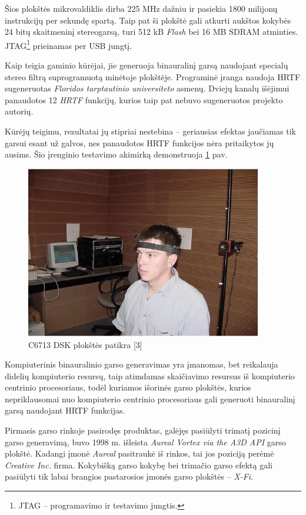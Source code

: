 \documentclass[]{vgtuef}
\begin{document}
Šios plokštės mikrovaldiklis dirba 225 MHz dažniu ir pasiekia 1800 milijonų instrukcijų per sekundę spartą. Taip pat ši plokštė gali atkurti aukštos kokybės 24 bitų skaitmeninį stereogarsą, turi 512 kB \textit{Flash} bei 16 MB SDRAM atminties. JTAG\footnote{  JTAG -- programavimo ir testavimo jungtis.} prieinamas per USB jungtį.

Kaip teigia gaminio kūrėjai, jie generuoja binauralinį garsą naudojant specialų stereo filtrą suprogramuotą minėtoje plokštėje. Programinė įranga naudoja HRTF sugeneruotas \textit{Floridos tarptautinio universiteto} asmenų. Dviejų kanalų išėjimui panaudotos 12 \textit{HRTF} funkcijų, kurios taip pat nebuvo sugeneruotos projekto autorių. 

Kūrėjų teigimu, rezultatai jų stipriai nestebina – geriausias efektas jaučiamas tik garsui esant už galvos, nes panaudotos HRTF funkcijos nėra pritaikytos jų ausims. Šio įrenginio testavimo akimirką demonstruoja \ref{fig:C6713_dsk_board_checkout} pav.

\begin{figure}[!ht]
  \centering
  \includegraphics[width=390px]{img/c6713_patikra.jpg}
  \caption{C6713 DSK plokštės patikra [3]}
  \label{fig:C6713_dsk_board_checkout}
\end{figure}


Kompiuterinis binauralinio garso generavimas yra įmanomas, bet reikalauja didelių kompiuterio resursų, taip atimdamas skaičiavimo resursus iš kompiuterio centrinio procesoriaus, todėl kuriamos išorinės garso plokštės, kurios nepriklausomai nuo kompiuterio centrinio procesoriaus gali generuoti binauralinį garsą naudojant HRTF funkcijas.

Pirmasis garso rinkoje pasirodęs produktas, galėjęs pasiūlyti trimatį pozicinį garso generavimą, buvo 1998 m. išleista \textit{Aureal Vortex via the A3D API} garso plokštė. Kadangi įmonė \textit{Aureal} pasitraukė iš rinkos, tai jos poziciją perėmė \textit{Creative Inc.} firma. Kokybišką garso kokybę bei trimačio garso efektą gali pasiūlyti tik labai brangios pastarosios įmonės garso plokštės – \textit{X-Fi}. 
\end{document}
